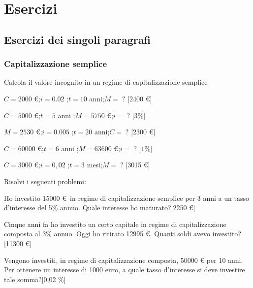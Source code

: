 
\section{Esercizi}

\subsection{Esercizi dei singoli paragrafi}



\subsubsection{Capitalizzazione semplice}

\begin{esercizio}
Calcola il valore incognito in un regime di capitalizzazione semplice
 \begin{enumeratea}
 \item $C = 2000$ \euro ;\quad $i = 0.02$ ;\quad $t = 10$ anni;\quad $M=\;?$ \hfill [2400 \euro]
 \item $C = 5000$ \euro ;\quad $t = 5$ anni ;\quad $M = 5750$ \euro;\quad $i=\;?$ \hfill [$3 \%$]
 \item $M = 2530$ \euro ;\quad $i = 0.005$ ;\quad $t = 20$ anni;\quad $C=\;?$ \hfill [2300 \euro]

 \item $C = 60000$ \euro ;\quad $t = 6$ anni ;\quad $M = 63600$ \euro;\quad $i=\;?$ \hfill [$1 \%$]

 \item $C = 3000$ \euro ;\quad $i = 0,02$ ;\quad $t = 3$ mesi;\quad $M=\;?$ \hfill [3015 \euro]

 \end{enumeratea}
\end{esercizio}


\begin{esercizio}
Risolvi i seguenti problemi:
 \begin{enumeratea}
  \item Ho investito 15000 \euro\, in regime di capitalizzazione semplice per 3 anni a un tasso d'interesse del 5\% annuo. Quale interesse ho maturato?\hfill [2250 \euro]
  \item Cinque anni fa ho investito un certo capitale in regime di capitalizzazione composta al 3\% annuo. Oggi ho ritirato 12995 \euro. Quanti soldi avevo investito?\hfill [11300 \euro]
  \item Vengono investiti, in regime di capitalizzazione composta, 50000 \euro\; per 10 anni. Per ottenere un interesse di 1000 euro, a quale tasso d'interesse si deve investire tale somma?\hfill [0,02 \%]
 \end{enumeratea}
\end{esercizio}

